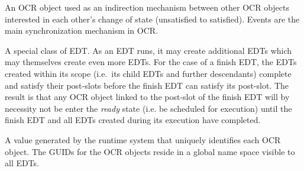 
\glossarydefstart
An OCR object used as an indirection mechanism between other OCR
objects interested in each other's change of state (unsatisfied to
satisfied). Events are the main synchronization mechanism in OCR.
\glossarydefend

\glossarydefstart
A special class of EDT. As an EDT runs, it may create additional EDTs
which may themselves create even more EDTs.
For the case of a finish
EDT, the EDTs created within its scope (i.e.\ its child EDTs and further
descendants) complete and satisfy their post-slots
before the finish EDT can satisfy its post-slot. The result is that
any OCR object linked to the post-slot of the finish EDT will by
necessity not be enter the \emph{ready} state (i.e. be scheduled for
execution) until the finish EDT and all
EDTs created during its execution have completed.
%
%

\glossarydefend


\glossarydefstart
A value generated by the runtime system that uniquely identifies each
OCR object. The GUIDs for the OCR objects reside in a global name
space visible to all EDTs.
\glossarydefend

%
%

